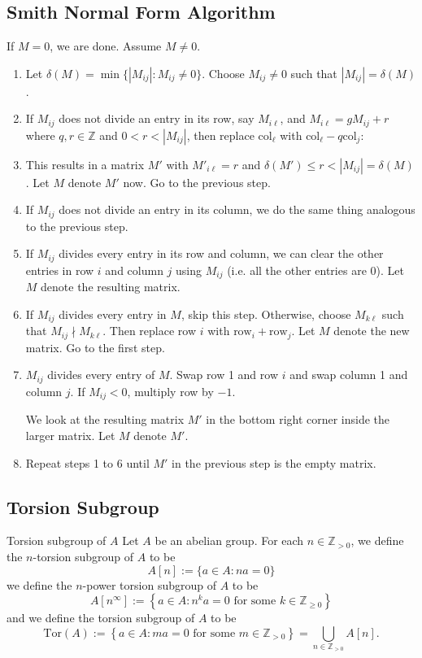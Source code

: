 \documentclass{article}
\begin{document}
\subsection{Smith Normal Form Algorithm}
If $M=0$, we are done. Assume $M \neq 0$.
\begin{enumerate}
    \item Let $\delta(M) = \min\{|M_{ij}| : M_{ij} \neq 0\}$. Choose $M_{ij} \neq 0$ such that $|M_{ij}|=\delta(M)$.
    \item If $M_{ij}$ does not divide an entry in its row, say $M_{i\ell}$, and $M_{i\ell}=gM_{ij}+r$ where $q,r \in \mathbb{Z}$ and $0<r<|M_{ij}|$, then replace $\text{col}_{\ell}$ with $\text{col}_{\ell}-q\text{col}_{j}$:
    \item This results in a matrix $M'$ with $M'_{i\ell}=r$ and $\delta(M') \le r < |M_{ij}| = \delta(M)$. Let $M$ denote $M'$ now. Go to the previous step.
    \item If $M_{ij}$ does not divide an entry in its column, we do the same thing analogous to the previous step.
    \item If $M_{ij}$ divides every entry in its row and column, we can clear the other entries in row $i$ and column $j$ using $M_{ij}$ (i.e. all the other entries are $0$). Let $M$ denote the resulting matrix.
    \item If $M_{ij}$ divides every entry in $M$, skip this step. Otherwise, choose $M_{k\ell}$ such that $M_{ij} \nmid M_{k\ell}.$ Then replace row $i$ with $\text{row}_i+\text{row}_j$. Let $M$ denote the new matrix. Go to the first step.
    \item $M_{ij}$ divides every entry of $M$. Swap row 1 and row $i$ and swap column 1 and column $j$. If $M_{ij} < 0$, multiply row by $-1$.
    
    We look at the resulting matrix $M'$ in the bottom right corner inside the larger matrix. Let $M$ denote $M'$.
    \item Repeat steps 1 to 6 until $M'$ in the previous step is the empty matrix.
\end{enumerate}
\subsection{Torsion Subgroup}
\begin{definition}{Torsion subgroup of $A$}
    Let $A$ be an abelian group. For each $n\in \mathbb{Z}_{>0}$, we define the $n$-torsion subgroup of $A$ to be
    \begin{equation}
        A[n] := \{a\in A: na = 0\}
    \end{equation}
    we define the $n$-power torsion subgroup of $A$ to be
    \begin{equation}
        A[n^\infty] := \left\{a\in A: n^k a = 0 \text{ for some } k \in \mathbb{Z}_{\ge 0}\right\}
    \end{equation}
    and we define the torsion subgroup of $A$ to be 
    \begin{equation}
        \text{Tor}(A) := \left\{a\in A: ma=0 \text{ for some } m\in \mathbb{Z}_{>0}\right\} = \bigcup_{n\in \mathbb{Z}_{>0}}A[n].
    \end{equation}
\end{definition}
\end{document}

